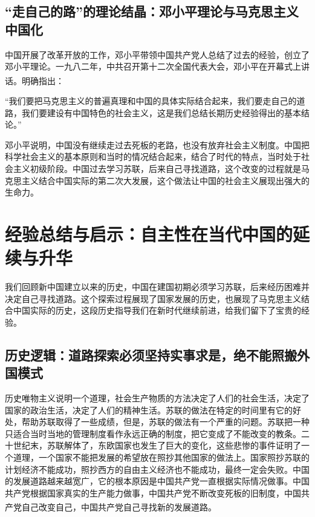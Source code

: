 \documentclass[12pt, a4paper]{ctexart}
\newcommand{\upcite}[1]{\textsuperscript{\cite{#1}}}
\numberwithin{table}{section}
\numberwithin{figure}{section}
\begin{document}
\subsection{“走自己的路”的理论结晶：邓小平理论与马克思主义中国化}
中国开展了改革开放的工作，邓小平带领中国共产党人总结了过去的经验，创立了邓小平理论。一九八二年，中共召开第十二次全国代表大会，邓小平在开幕式上讲话。明确指出\upcite{ref14}：

\begin{quotebox}[邓小平在中共十二大开幕式上的讲话（1982年）]
\kaishu “我们要把马克思主义的普遍真理和中国的具体实际结合起来，我们要走自己的道路，我们要建设有中国特色的社会主义，这是我们总结长期历史经验得出的基本结论。”
\end{quotebox}

邓小平说明，中国没有继续走过去死板的老路，也没有放弃社会主义制度。中国把科学社会主义的基本原则和当时的情况结合起来，结合了时代的特点，当时处于社会主义初级阶段。中国过去学习苏联，后来自己寻找道路，这个改变的过程就是马克思主义结合中国实际的第二次大发展，这个做法让中国的社会主义展现出强大的生命力。

\section{经验总结与启示：自主性在当代中国的延续与升华}
我们回顾新中国建立以来的历史，中国在建国初期必须学习苏联，后来经历困难并决定自己寻找道路。这个探索过程展现了国家发展的历史，也展现了马克思主义结合中国实际的历史，这段历史指导我们在新时代继续前进，给我们留下了宝贵的经验。

\subsection{历史逻辑：道路探索必须坚持实事求是，绝不能照搬外国模式}
历史唯物主义说明一个道理，社会生产物质的方法决定了人们的社会生活，决定了国家的政治生活，决定了人们的精神生活。苏联的做法在特定的时间里有它的好处，帮助苏联取得了一些成绩，但是，苏联的做法有一个严重的问题。苏联把一种只适合当时当地的管理制度看作永远正确的制度，把它变成了不能改变的教条。二十世纪末，苏联解体了，东欧国家也发生了巨大的变化，这些悲惨的事件证明了一个道理，一个国家不能把发展的希望放在照抄其他国家的做法上。国家照抄苏联的计划经济不能成功，照抄西方的自由主义经济也不能成功，最终一定会失败。中国的发展道路越来越宽广，它的根本原因是中国共产党一直根据实际情况做事。中国共产党根据国家真实的生产能力做事，中国共产党不断改变死板的旧制度，中国共产党自己改变自己，中国共产党自己寻找新的发展道路\upcite{ref15}。
\end{document}
